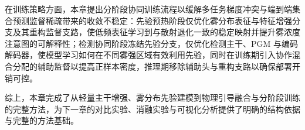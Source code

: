 在训练策略方面，本章提出分阶段协同训练流程以缓解多任务梯度冲突与端到端集合预测监督稀疏带来的收敛不稳定：先验预热阶段仅优化雾分布表征与特征增强分支及其重构监督支路，使低频表征学习到与散射退化一致的稳定映射并提升雾浓度注意图的可解释性；检测协同阶段冻结先验分支，仅优化检测主干、PGM 与编码解码器，使模型学习如何在不同雾强区域有效利用先验，同时在训练期引入协作混合分配的辅助监督以提高正样本密度，推理期移除辅助头与重构支路以确保部署开销可控。

综上，本章完成了从轻量主干增强、雾分布先验建模到物理引导融合与分阶段训练的完整方法，为下一章的对比实验、消融实验与可视化分析提供了明确的结构依据与完整的方法基础。